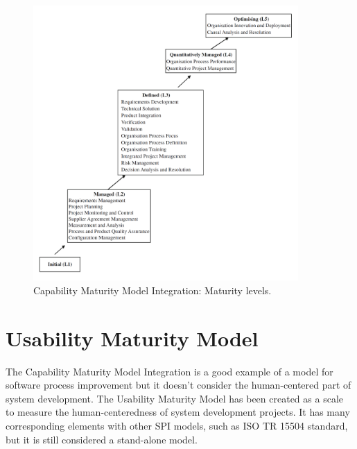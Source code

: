 \documentclass[12pt,a4paper,oneside,pdftex]{report}
\begin{document}
\begin{figure}[H]
  	\centering
  	\includegraphics[width=0.9\textwidth]{./images/cmmi_levels.png}
  	\caption{Capability Maturity Model Integration: Maturity levels. \cite{RefWorks:29}}
	\label{fig:cmmi}
\end{figure}



\section{Usability Maturity Model}
The Capability Maturity Model Integration is a good example of a model for software process improvement but it doesn't consider the human-centered part of system development. The Usability Maturity Model has been created as a scale to measure the human-centeredness of system development projects. It has many corresponding elements with other SPI models, such as ISO TR 15504 standard, but it is still considered a stand-alone model. \cite{RefWorks:30}
\end{document}
